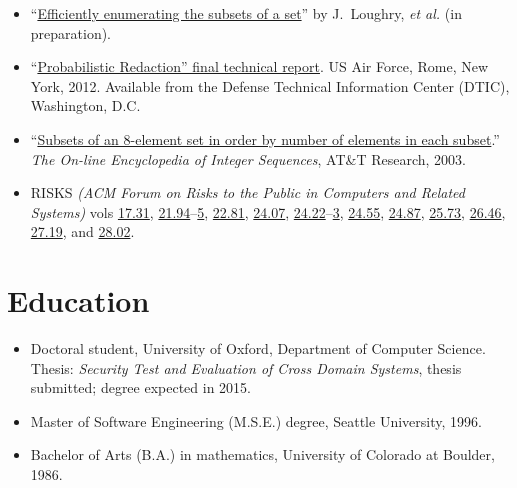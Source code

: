 \documentclass[12pt,twoside,letterpaper]{article}
\begin{document}
\begin{itemize}
	\item ``\href{http://www.call-with-current-continuation.com/papers/subset.pdf}%
{Efficiently enumerating the subsets of a set}'' by J.\ Loughry,
{\it et al.} (in preparation).\vspace{-1mm}

	\item ``\href{http://call-with-current-continuation.com/papers/Loughry2011.pdf}%
{Probabilistic Redaction'' final technical report}. US Air Force, Rome,
New York, 2012. Available from the Defense Technical Information Center
(DTIC), Washington, D.C.\vspace{-1mm}

	\item ``\href{http://oeis.org/A047869}{Subsets of an 8-element set
		in order by number of elements in each subset}.'' \emph{The On-line
		Encyclopedia of Integer Sequences}, AT\&T Research, 2003.\vspace{-1mm}

	\item RISKS \emph{(ACM Forum on Risks to the Public in Computers
		and Related Systems)} vols
		\href{http://catless.ncl.ac.uk/Risks/17.31.html}{17.31},
		\href{http://catless.ncl.ac.uk/Risks/21.94.html}{21.94}--\href{http://catless.ncl.ac.uk/Risks/21.95.html}{5},
		\href{http://catless.ncl.ac.uk/Risks/21.81.html}{22.81},
		\href{http://catless.ncl.ac.uk/Risks/24.07.html}{24.07},
		\href{http://catless.ncl.ac.uk/Risks/24.22.html}{24.22}--\href{http://catless.ncl.ac.uk/Risks/24.23.html}{3},
		\href{http://catless.ncl.ac.uk/Risks/24.55.html}{24.55},
		\href{http://catless.ncl.ac.uk/Risks/24.87.html}{24.87},
		\href{http://catless.ncl.ac.uk/Risks/25.73.html}{25.73},
		\href{http://catless.ncl.ac.uk/Risks/26.46.html}{26.46},
		\href{http://catless.ncl.ac.uk/Risks/27.19.html}{27.19},
		and \href{http://catless.ncl.ac.uk/Risks/28.02.html}{28.02}.
\end{itemize}

\vspace{-7mm}
\section*{Education}
\vspace{-2mm}

\begin{itemize}
	\item Doctoral student, University of Oxford, Department of
		Computer Science. Thesis: \emph{Security Test and
		Evaluation of Cross Domain Systems}, thesis submitted; degree expected in 2015.\vspace{-1mm}
	\item Master of Software Engineering (M.S.E.) degree, Seattle University, 1996.\vspace{-1mm}
	\item Bachelor of Arts (B.A.) in mathematics, University of Colorado at Boulder, 1986.
\end{itemize}
\end{document}
